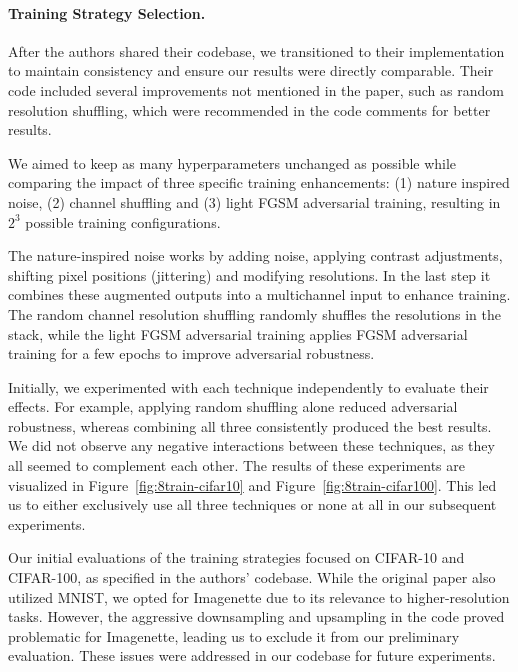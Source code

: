 \documentclass[a4paper, oneside]{discothesis}
\begin{document}
\paragraph{Training Strategy Selection.}

After the authors shared their codebase, we transitioned to their implementation to maintain consistency and ensure our results were directly comparable. Their code included several improvements not mentioned in the paper, such as random resolution shuffling, which were recommended in the code comments for better results. 

We aimed to keep as many hyperparameters unchanged as possible while comparing the impact of three specific training enhancements: (1) nature inspired noise, (2) channel shuffling and (3) light FGSM adversarial training, resulting in $2^3$ possible training configurations.

The nature-inspired noise works by adding noise, applying contrast adjustments, shifting pixel positions (jittering) and modifying resolutions. In the last step it combines these augmented outputs into a multichannel input to enhance training. The random channel resolution shuffling randomly shuffles the resolutions in the stack, while the light FGSM adversarial training applies FGSM adversarial training for a few epochs to improve adversarial robustness.

Initially, we experimented with each technique independently to evaluate their effects. For example, applying random shuffling alone reduced adversarial robustness, whereas combining all three consistently produced the best results. We did not observe any negative interactions between these techniques, as they all seemed to complement each other. The results of these experiments are visualized in Figure~\ref{fig:8train-cifar10} and Figure~\ref{fig:8train-cifar100}. This led us to either exclusively use all three techniques or none at all in our subsequent experiments.

Our initial evaluations of the training strategies focused on CIFAR-10 and CIFAR-100, as specified in the authors' codebase. While the original paper also utilized MNIST, we opted for Imagenette due to its relevance to higher-resolution tasks. However, the aggressive downsampling and upsampling in the code proved problematic for Imagenette, leading us to exclude it from our preliminary evaluation. These issues were addressed in our codebase for future experiments.
\end{document}
